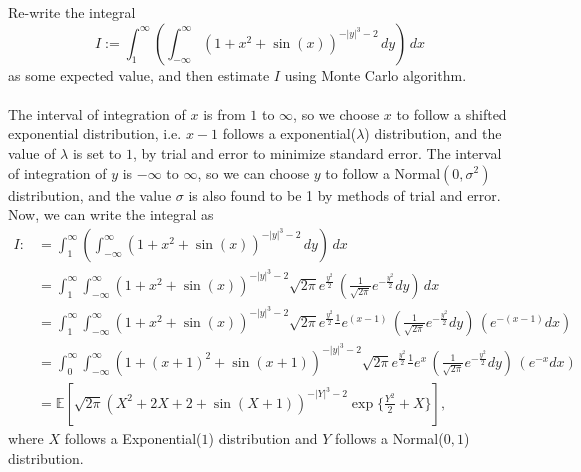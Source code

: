 
Re-write the integral
$$I:=\int_1^\infty\left(\int_{-\infty}^\infty(1+x^2+\sin(x))^{-|y|^3-2}\,dy \right)\,dx$$
as some expected value, and then estimate $I$ using Monte Carlo algorithm.\\
\\
The interval of integration of $x$ is from $1$ to $\infty$, so we choose $x$ to follow a shifted exponential distribution, i.e. $x-1$ follows a exponential($\lambda$) distribution, and the value of $\lambda$ is set to $1$, by trial and error to minimize standard error. The interval of integration of $y$ is $-\infty$ to $\infty$, so we can choose $y$ to follow a Normal$(0,\sigma^2)$ distribution, and the value $\sigma$ is also found to be 1 by methods of trial and error. 
Now, we can write the integral as
\begin{align*}
I:&=\int_1^\infty\left(\int_{-\infty}^\infty(1+x^2+\sin(x))^{-|y|^3-2}\,dy \right)\,dx\\
  &=\int_1^\infty\int_{-\infty}^\infty(1+x^2+\sin(x))^{-|y|^3-2}\sqrt{2\pi}e^{\frac{y^2}{2}}\,\left(\frac{1}{\sqrt{2\pi}}e^{-\frac{y^2}{2}}dy\right) \,dx\\
  &=\int_1^\infty\int_{-\infty}^\infty(1+x^2+\sin(x))^{-|y|^3-2}\sqrt{2\pi}e^{\frac{y^2}{2}}\frac{1}{}e^{(x-1)}\,\left(\frac{1}{\sqrt{2\pi}}e^{-\frac{y^2}{2}}dy\right) \,\left( e^{-(x-1)}dx\right)\\
  &=\int_0^\infty\int_{-\infty}^\infty(1+(x+1)^2+\sin(x+1))^{-|y|^3-2}\sqrt{2\pi}e^{\frac{y^2}{2}}\frac{1}{}e^{ x}\,\left(\frac{1}{\sqrt{2\pi}}e^{-\frac{y^2}{2}}dy\right) \,\left( e^{- x}dx\right)\\
  &=\mathbb{E}\left[{\sqrt{2\pi}}(X^2+2X+2+\sin(X+1))^{-|Y|^3-2}\exp\{\frac{Y^2}{2}+X\}\right],
\end{align*}
where $X$ follows a Exponential($1$) distribution and $Y$ follows a Normal($0,1$) distribution.

